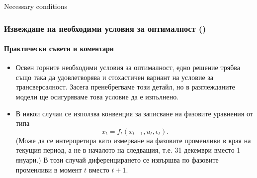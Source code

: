 \documentclass[10pt]{beamer}
\theoremstyle{definition}
\begin{document}
\begin{section}{Necessary conditions}
\begin{frame}
\frametitle{Извеждане на необходими условия за оптималност ()}
\framesubtitle{Практически съвети и коментари}
\begin{itemize}
\item Освен горните необходими условия за оптималност, едно решение трябва също така да удовлетворява и стохастичен вариант на условие за трансверсалност. Засега пренебрегваме този детайл, но в разглежданите модели ще осигуряваме това условие да е изпълнено. 
\item В някои случаи се използва конвенция за записване на фазовите уравнения от типа \[ x_t = f_t(x_{t-1},u_t,\epsilon_t). \] (Може да се интерпретира като измерване на фазовите променливи в края на текущия период, а не в началото на следващия, т.е. 31 декември вместо 1 януари.) В този случай диференцирането се извършва по фазовите променливи в момент $ t $ вместо $ t+1 $.
\end{itemize}
\end{frame}

\end{section}
\end{document}
